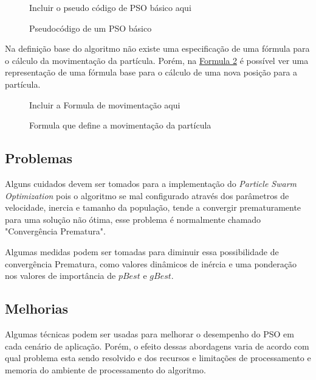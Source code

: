         \begin{figure}[h]
            \centering
            \small{Incluir o pseudo código de PSO básico aqui}
            \caption{Pseudocódigo de um PSO básico}
            \label{alg:pso-base}
        \end{figure}

        Na definição base do algoritmo não existe uma especificação de uma fórmula para o cálculo da movimentação da partícula. Porém, na 
        \hyperref[fig:formula-movimentacao]{Formula \ref{fig:formula-movimentacao}} 
        é possível ver uma representação de uma fórmula base para o cálculo de uma nova posição para a partícula.
                
        \begin{figure}[h]
            \centering
            \small{Incluir a Formula de movimentação aqui}
            \caption{Formula que define a movimentação da partícula}
            \label{fig:formula-movimentacao}
        \end{figure}

    

    \subsection{Problemas}
        Alguns cuidados devem ser tomados para a implementação do \textit{Particle Swarm Optimization} pois o algoritmo se mal configurado através dos parâmetros de velocidade, inercia e tamanho da população, tende a convergir prematuramente para uma solução não ótima, esse problema é normalmente chamado "Convergência Prematura".\hfill\vspace{\onelineskip}
        
        Algumas medidas podem ser tomadas para diminuir essa possibilidade de convergência Prematura, como valores dinâmicos de inércia e uma ponderação nos valores de importância de $pBest$ e $gBest$.


    \subsection{Melhorias}
            Algumas técnicas podem ser usadas para melhorar o desempenho do PSO em cada cenário de aplicação. Porém, o efeito dessas abordagens varia de acordo com qual problema esta sendo resolvido e dos recursos e limitações de processamento e memoria do ambiente de processamento do algoritmo.

